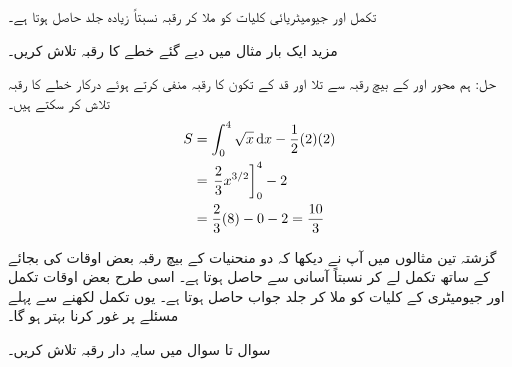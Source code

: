 تکمل اور جیومیٹریائی کلیات کو ملا کر رقبہ نسبتاً زیادہ جلد حاصل ہوتا ہے۔

مزید ایک بار مثال  میں دیے گئے خطے کا رقبہ تلاش کریں۔

حل:\quad
ہم  محور   اور  کے بیچ رقبہ سے تلا  اور قد  کے تکون کا رقبہ منفی کرتے ہوئے درکار خطے کا رقبہ تلاش کر سکتے ہیں۔ 
\begin{align*}
S&=\int_0^4\sqrt{x}\dif x-\frac{1}{2}(2)(2)\\
&=\left. \frac{2}{3}x^{3/2}\right]_0^4-2\\
&=\frac{2}{3}(8)-0-2=\frac{10}{3}
\end{align*}

گزشتہ تین مثالوں میں آپ نے دیکھا کہ دو منحنیات کے بیچ رقبہ بعض اوقات  کی بجائے  کے ساتھ تکمل لے کر نسبتاً آسانی سے حاصل ہوتا ہے۔ اسی طرح بعض اوقات تکمل اور جیومیٹری کے کلیات کو ملا کر جلد جواب حاصل ہوتا ہے۔ یوں تکمل لکھنے سے پہلے مسئلے پر غور کرنا بہتر ہو گا۔


سوال  تا سوال  میں سایہ دار رقبہ تلاش کریں۔

